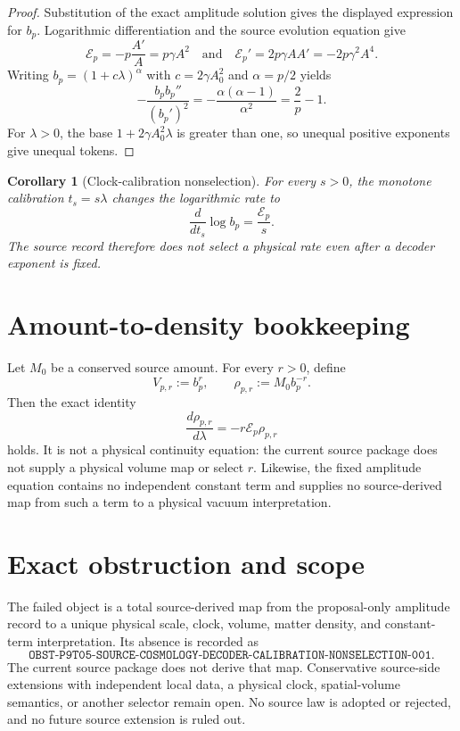 \documentclass[11pt]{article}
\newtheorem{corollary}{Corollary}
\newcommand{\Ainit}{A_{\!0}}
\newcommand{\Etoken}{\mathcal E}
\begin{document}
\begin{proof}
Substitution of the exact amplitude solution gives the displayed expression
for \(b_p\).  Logarithmic differentiation and the source evolution equation
give
\[
 \Etoken_p=-p\frac{A'}A=p\gamma A^2
 \quad\text{and}\quad
 \Etoken_p'=2p\gamma A A'=-2p\gamma^2 A^4.
\]
Writing \(b_p=(1+c\lambda)^\alpha\) with
\(c=2\gamma\Ainit^2\) and \(\alpha=p/2\) yields
\[
 -\frac{b_p b_p''}{(b_p')^2}
   =-\frac{\alpha(\alpha-1)}{\alpha^2}
   =\frac{2}{p}-1 .
\]
For \(\lambda>0\), the base \(1+2\gamma\Ainit^2\lambda\) is greater than one,
so unequal positive exponents give unequal tokens.
\end{proof}

\begin{corollary}[Clock-calibration nonselection]
For every \(s>0\), the monotone calibration \(t_s=s\lambda\) changes the
logarithmic rate to
\[
 \frac{d}{dt_s}\log b_p=\frac{\Etoken_p}{s}.
\]
The source record therefore does not select a physical rate even after a
decoder exponent is fixed.
\end{corollary}

\section{Amount-to-density bookkeeping}

Let \(M_0\) be a conserved source amount.  For every \(r>0\), define
\[
 V_{p,r}:=b_p^r,\qquad
 \rho_{p,r}:=M_0 b_p^{-r}.
\]
Then the exact identity
\[
 \frac{d\rho_{p,r}}{d\lambda}
   =-r\Etoken_p\rho_{p,r}
\]
holds.  It is not a physical continuity equation: the current source package
does not supply a physical volume map or select \(r\).  Likewise, the fixed
amplitude equation contains no independent constant term and supplies no
source-derived map from such a term to a physical vacuum interpretation.

\section{Exact obstruction and scope}

The failed object is a total source-derived map from the proposal-only
amplitude record to a unique physical scale, clock, volume, matter density,
and constant-term interpretation.  Its absence is recorded as
\[
\texttt{OBST-P9T05-SOURCE-COSMOLOGY-DECODER-CALIBRATION-NONSELECTION-001}.
\]
The current source package does not derive that map.  Conservative
source-side extensions with independent local data, a physical clock,
spatial-volume semantics, or another selector remain open.  No source law is
adopted or rejected, and no future source extension is ruled out.
\end{document}
